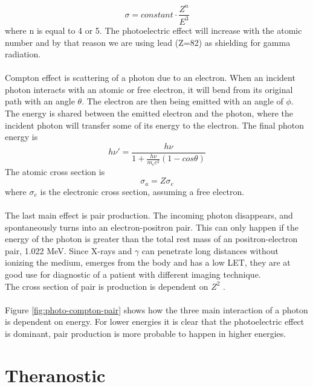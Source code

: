 \documentclass[twoside,english]{uiofysmaster/uiofysmaster}
\begin{document}
$$\sigma = constant \cdot \frac{Z^n}{E^3}$$
where n is equal to 4 or 5\cite{Radiological_physics}. The photoelectric effect will increase with the atomic number and by that reason we are using lead (Z=82) as shielding for gamma radiation.\\ 
\\
Compton effect is scattering of a photon due to an electron. When an incident photon interacts with an atomic or free electron, it will bend from its original path with an angle $\theta$. The electron are then being emitted with an angle of $\phi$.\\
The energy is shared between the emitted electron and the photon, where the incident photon will transfer some of its energy to the electron. The final photon energy is $$h\nu' = \frac{h\nu}{1 + \frac{h\nu}{m_ec^2} (1-cos\theta)}$$
The atomic cross section is $$\sigma_a = Z \sigma_e$$ where $\sigma_e$ is the electronic cross section, assuming a free electron\cite{nuclearchem}.\\
\\
The last main effect is pair production. The incoming photon disappears, and spontaneously turns into an electron-positron pair. This can only happen if the energy of the photon is greater than the total rest mass of an positron-electron pair, 1.022 MeV. Since X-rays and $\gamma$ can penetrate long distances without ionizing the medium, emerges from the body and has a low LET, they are at good use for diagnostic of a patient with different imaging technique. \\
The cross section of pair is production is dependent on $Z^2$ .
\\
\\
Figure \ref{fig:photo-compton-pair} shows how the three main interaction of a photon is dependent on energy. For lower energies it is clear that the photoelectric effect is dominant, pair production is more probable to happen in higher energies.\\


\section{Theranostic}
\label{sec:theranostic}




\end{document}
